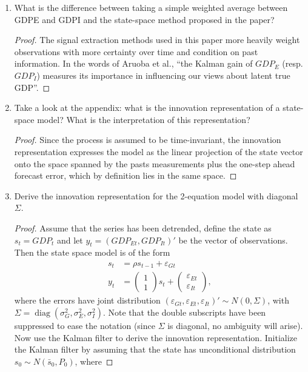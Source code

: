 \documentclass[oneside,reqno]{amsart}
\DeclareMathOperator{\diag}{diag}
\newcommand{\eps}{\varepsilon}
\theoremstyle{definition}
\begin{document}
\begin{enumerate}[label=(\roman*)]
\begin{proof}
\begin{enumerate}[label=(\arabic*)]
\end{enumerate}
\end{proof}
\item
What is the difference between taking a simple weighted average between GDPE and GDPI and the state-space method proposed in the paper?
\begin{proof}
The signal extraction methods used in this paper more heavily weight observations with more certainty over time and condition on past information. In the words of  Aruoba et al., ``the Kalman gain of $GDP_E$ (resp. $GDP_I$) measures its importance in influencing our views about latent true GDP''.
\end{proof}
\item
Take a look at the appendix: what is the innovation representation of a
state-space model? What is the interpretation of this representation?
\begin{proof}
Since the process is assumed to be time-invariant, the innovation representation expresses the model as the linear projection of the state vector onto the space spanned by the pasts measurements plus the one-step ahead forecast error, which by definition lies in the same space.
\end{proof}
\item
Derive the innovation representation for the 2-equation model with diagonal $\Sigma$.
\begin{proof}
Assume that the series has been detrended, define the state as $s_t = GDP_t$ and let $y_t = (GDP_{Et}, GDP_{It})'$ be the vector of observations. Then the state space model is of the form
\begin{align}
	s_t & =  \rho s_{t-1} + \eps_{Gt} \\
	y_t &= \begin{pmatrix}
		1 \\ 1
	\end{pmatrix} s_t
	+ \begin{pmatrix}
		\eps_{Et} \\ \eps_{It}
	\end{pmatrix},
\end{align}
where the errors have joint distribution $(\eps_{Gt}, \eps_{Et}, \eps_{It})' \sim N(0, \Sigma)$, with $\Sigma = \diag(\sigma_{G}^2, \sigma_{E}^2, \sigma_{I}^2)$. Note that the double subscripts have been suppressed to ease the notation (since $\Sigma$ is diagonal, no ambiguity will arise). Now use the Kalman filter to derive the innovation representation. Initialize the Kalman filter by assuming that the state has unconditional distribution $s_0 \sim N(\bar s_0, P_0)$, where

\end{proof}
\end{enumerate}
\end{document}
